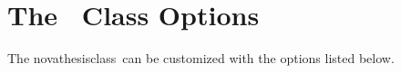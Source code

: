
\section{The \ Class Options}
\label{sec:package_options}

The \gls{novathesisclass}\ can be customized with the options listed below.

\newcommand{\classoption}[4]{\textbf{#1=OPT}\newline\emph{\small#2}&\textbf{#3}\newline{\small#4}\\}
\newcommand{\defaultopt}[1]{$\Rightarrow$~\emph{Default: \texttt{#1}}\newline}
\newcommand{\defaultit}[1][default]{($\Leftarrow$~\emph{#1})}

